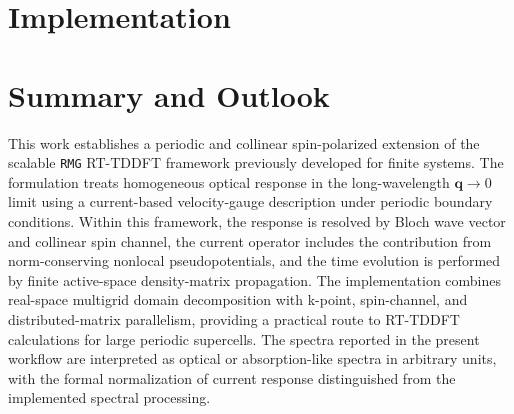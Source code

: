 \documentclass[journal=jctcce,manuscript=article,etalmode=truncate,maxauthors=10,layout=onecolumn]{achemso}
\begin{document}






% 
% 


\section{Implementation} 
\label{sec:implementation}







\section{Summary and Outlook}
\label{sec:summary}

This work establishes a periodic and collinear spin-polarized extension
of the scalable \texttt{RMG} RT-TDDFT framework previously developed
for finite systems.\cite{jakowski-rmg-tddft-2025}  The formulation
treats homogeneous optical response in the long-wavelength
$\mathbf q\rightarrow0$ limit using a current-based velocity-gauge
description under periodic boundary conditions.  Within this framework,
the response is resolved by Bloch wave vector and collinear spin
channel, the current operator includes the contribution from
norm-conserving nonlocal pseudopotentials, and the time evolution is
performed by finite active-space density-matrix propagation.  The
implementation combines real-space multigrid domain decomposition with
k-point, spin-channel, and distributed-matrix parallelism, providing a
practical route to RT-TDDFT calculations for large periodic supercells.
The spectra reported in the present workflow are interpreted as optical
or absorption-like spectra in arbitrary units, with the formal
normalization of current response distinguished from the implemented
spectral processing.
\end{document}
